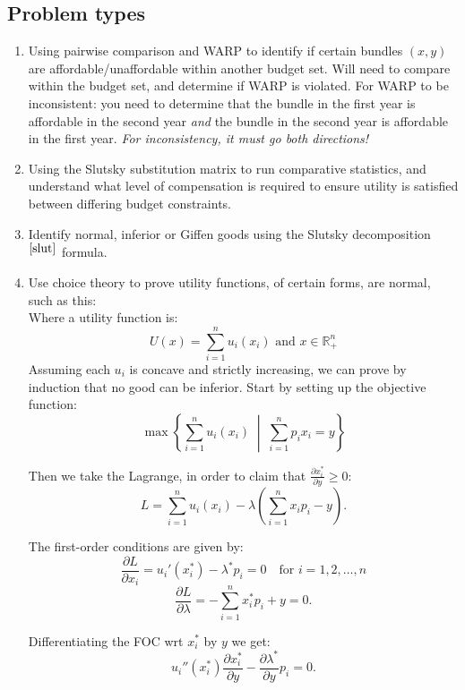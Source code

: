 \documentclass{article}
\begin{document}
\subsection{Problem types}
\begin{enumerate}
    \item Using pairwise comparison and WARP to identify if certain bundles $(x,y)$ are affordable/unaffordable within another budget set. Will need to compare within the budget set, and determine if WARP is violated. For WARP to be inconsistent: you need to determine that the bundle in the first year is affordable in the second year \textit{and} the bundle in the second year is affordable in the first year. \textit{For inconsistency, it must go both directions!}
    \item Using the Slutsky substitution matrix to run comparative statistics, and understand what level of compensation is required to ensure utility is satisfied between differing budget constraints.
    \item Identify normal, inferior or Giffen goods using the Slutsky decomposition$^{\ref{slut}}$ formula.
    \item Use choice theory to prove utility functions, of certain forms, are normal, such as this: \\
    Where a utility function is: 
            \[
            U(x) = \sum_{i=1}^n u_i(x_i)
            \text{  and  }  x \in \mathbb{R}_+^n  
            \]
            Assuming each \( u_i \) is concave and strictly increasing, we can prove by induction that no good can be inferior. Start by setting up the objective function: 
            \[
            \max \left\{ \sum_{i=1}^n u_i(x_i) \;\middle|\; \sum_{i=1}^n p_i x_i = y \right\} 
            \]
            
            Then we take the Lagrange, in order to claim that $\frac{\partial x_i^*}{\partial y} \geq 0$:
            \[
            L = \sum_{i=1}^n u_i(x_i) - \lambda \left( \sum_{i=1}^n x_i p_i - y \right).
            \]
            
            The first-order conditions are given by:
            \[
            \frac{\partial L}{\partial x_i} = u_i'(x_i^*) - \lambda^* p_i = 0 \quad \text{for } i = 1, 2, \ldots, n \tag{1}
            \]
            \[
            \frac{\partial L}{\partial \lambda} = -\sum_{i=1}^n x_i^* p_i + y = 0. \tag{2}
            \]
            
            Differentiating the FOC wrt $x_i^*$ by \(y\) we get:
            \[
            u_i''(x_i^*) \frac{\partial x_i^*}{\partial y} - \frac{\partial \lambda^*}{\partial y} p_i = 0.
            \]
            

\end{enumerate}
\end{document}
